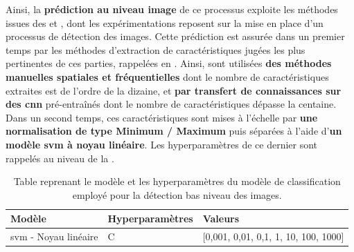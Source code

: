 Ainsi, la \textbf{prédiction au niveau image} de ce processus exploite les méthodes issues des  et , dont les expérimentations reposent sur la mise en place d'un processus de détection des images. Cette prédiction est assurée dans un premier temps par les méthodes d'extraction de caractéristiques jugées les plus pertinentes de ces parties, rappelées en . Ainsi, sont utilisées \textbf{des méthodes manuelles spatiales et fréquentielles} dont le nombre de caractéristiques extraites est de l'ordre de la dizaine, et \textbf{par transfert de connaissances sur des \gls{cnn}} pré-entraînés dont le nombre de caractéristiques dépasse la centaine. Dans un second temps, ces caractéristiques sont mises à l'échelle par \textbf{une normalisation de type Minimum / Maximum} puis séparées à l'aide d'\textbf{un modèle \gls{svm} à noyau linéaire}. Les hyperparamètres de ce dernier sont rappelés au niveau de la  .\par

\begin{table}[H]
    \centering
    \begin{tabular}{lll}
        \toprule
        \textbf{Modèle}                                 & \textbf{Hyperparamètres}  & \textbf{Valeurs}                          \\ \midrule
        \gls{svm} - Noyau linéaire                      & C                         & [0,001, 0,01, 0,1, 1, 10, 100, 1000]      \\ 
        \bottomrule 
    \end{tabular} 
    \caption{Table reprenant le modèle et les hyperparamètres du modèle de classification employé pour la détection bas niveau des images.}
    \label{tab:parameters_lesion_classification_image_supervised}
\end{table}\par

